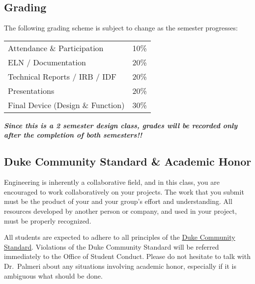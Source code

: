 \subsection*{Grading} 
The following grading scheme is subject to change as the semester progresses:

\begin{center}
\begin{tabular}{ll}
Attendance \& Participation             & 10\% \\
ELN / Documentation                     & 20\% \\
Technical Reports / IRB / IDF           & 20\% \\
Presentations                           & 20\% \\
Final Device (Design \& Function)       & 30\% \\
\end{tabular}
\end{center}

\emph{\bf Since this is a 2 semester design class, grades will be recorded only
    after the completion of both semesters!!}

\subsection*{Duke Community Standard \& Academic Honor} Engineering is
inherently a collaborative field, and in this class, you are encouraged to work
collaboratively on your projects.  The work that you submit must be the product
of your and your group's effort and understanding.  All resources developed by
another person or company, and used in your project, must be properly
recognized.
 
All students are expected to adhere to all principles of the
\href{http://www.integrity.duke.edu/standard.html}{Duke Community Standard}.
Violations of the Duke Community Standard will be referred immediately to the
Office of Student Conduct.  Please do not hesitate to talk with Dr.\ Palmeri
about any situations involving academic honor, especially if it is ambiguous
what should be done.


